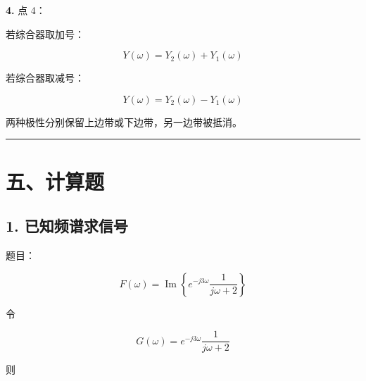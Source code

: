 \documentclass[11pt]{ctexart}
\begin{document}
\noindent\textbf{4.} 点 4：\par



若综合器取加号：\par



\[

   Y(\omega)=Y_2(\omega)+Y_1(\omega)

   \]



若综合器取减号：\par



\[

   Y(\omega)=Y_2(\omega)-Y_1(\omega)

   \]



两种极性分别保留上边带或下边带，另一边带被抵消。\par



\medskip\hrule\medskip



\section*{五、计算题}



\subsection*{1. 已知频谱求信号}



题目：\par



\[

F(\omega)=\operatorname{Im}\left\{

e^{-j3\omega}\frac{1}{j\omega+2}

\right\}

\]



令\par



\[

G(\omega)=e^{-j3\omega}\frac{1}{j\omega+2}

\]



则\par
\end{document}
